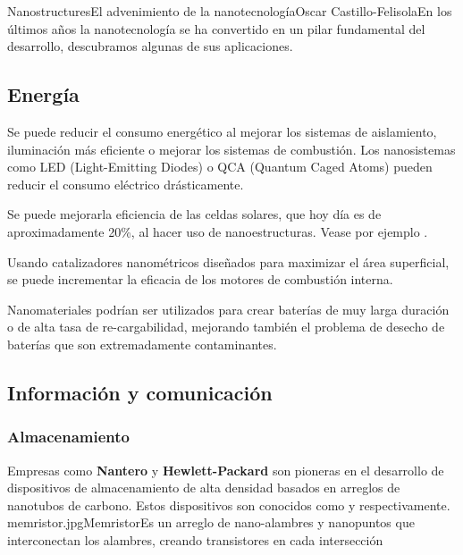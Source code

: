 \begin{article}{Nanostructures}{El advenimiento de la nanotecnolog\'ia}{Oscar Castillo-Felisola}{En los \'ultimos a\~nos la nanotecnolog\'ia se ha convertido en un pilar fundamental del desarrollo, descubramos algunas de sus aplicaciones.}
\subsection{Energ\'ia}
\begin{Aufzaehlung}
\item 
Se puede reducir el consumo energ\'etico al mejorar los sistemas de aislamiento, iluminaci\'on m\'as eficiente o mejorar los sistemas de combusti\'on. Los nanosistemas como LED (Light-Emitting Diodes) o QCA (Quantum Caged Atoms) pueden reducir el consumo el\'ectrico dr\'asticamente.

\item 
Se puede mejorarla eficiencia de las celdas solares, que hoy d\'ia es de aproximadamente 20\%, al hacer uso de nanoestructuras. Vease por ejemplo .

\item 
Usando catalizadores nanom\'etricos dise\~nados para maximizar el \'area superficial, se puede incrementar la eficacia de los motores de combusti\'on interna.

\item 
Nanomateriales podr\'ian ser utilizados para crear bater\'ias de  muy larga duraci\'on o de alta tasa de re-cargabilidad, mejorando tambi\'en el problema de desecho de bater\'ias que son extremadamente contaminantes.
\end{Aufzaehlung}



\subsection{Informaci\'on y comunicaci\'on}
\subsubsection*{Almacenamiento}
Empresas como {\bf Nantero} y {\bf Hewlett-Packard} son pioneras en el desarrollo de dispositivos de almacenamiento de alta densidad basados en arreglos de nanotubos de carbono. Estos dispositivos son conocidos como  y  respectivamente.
\Bild%
    {memristor.jpg}{Memristor}{Es un arreglo de nano-alambres y nanopuntos que interconectan los alambres, creando transistores en cada intersecci\'on}


\end{article}
